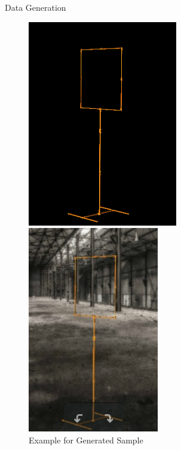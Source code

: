 \documentclass{beamer}
\begin{document}
\begin{frame}[fragile]
\begin{columns}[T]
\begin{column}{.25\textwidth}
\begin{block}{Data Generation}
		\begin{figure}
			\begin{minipage}{0.4\textwidth}
				\centering
				\includegraphics[height=9cm]{fig/gate}

			\end{minipage}
			\begin{minipage}{0.4\textwidth}
				\centering
				\includegraphics[height=9cm]{fig/gate_backgr}
				
			\end{minipage}
\caption{Example for Generated Sample}
		\end{figure}
	\end{block}

\end{column}



\begin{column}{.45\textwidth}


\end{column}
\end{columns}
\end{frame}
\end{document}

